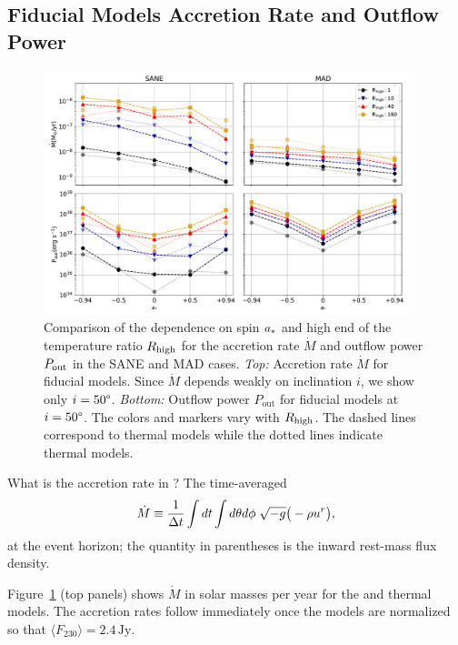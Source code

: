 \subsection{Fiducial Models Accretion Rate and Outflow Power}
\label{sec:accrate_outflowpower}

\begin{figure}
  \centering
  \includegraphics[width=0.95\textwidth]{figures/bhac_kharma_average_mdot_pout.pdf}
  \caption{Comparison of the dependence on spin $a_*$ and high end of the temperature ratio $R_\mathrm{high}$ for the accretion rate $\dot{M}$ and outflow power $P_{\rm out}$ in the SANE and MAD cases.
    {\it Top:} Accretion rate $\dot{M}$ for fiducial models.
    Since $\dot{M}$ depends weakly on inclination $i$, we show only $i=50\degree$.
    {\it Bottom:} Outflow power $P_\mathrm{out}$ for fiducial models at $i = 50\degree$.
    The colors and markers vary with $R_\mathrm{high}$.
    The dashed lines correspond to \kharma thermal models while the dotted lines indicate \bhac thermal models.}
  \label{fig:accretion_outflow_power_illinois_thermal}
\end{figure}

What is the accretion rate in \sgra?  The time-averaged 
\begin{equation}
  \dot{M} \equiv \frac{1}{\Delta t}\int dt\int d\theta d\phi\hspace{0.1cm}\sqrt{-g}\big(-\rho u^{r}\big),
\end{equation}
at the event horizon; the quantity in parentheses is the inward rest-mass flux density.

Figure~\ref{fig:accretion_outflow_power_illinois_thermal} (top panels) shows $\dot{M}$ in solar masses per year for the \kharma and \bhac thermal models.
The accretion rates follow immediately once the models are normalized so that $\langle F_{230}\rangle = 2.4\,\mathrm{Jy}$.

